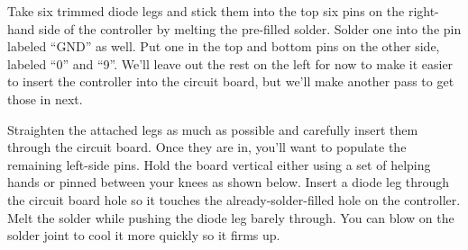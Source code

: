 \documentclass{article}
\begin{document}
\vspace{1em}

Take six trimmed diode legs and stick them into the top six pins on
the right-hand side of the controller by melting the pre-filled
solder. Solder one into the pin labeled ``GND'' as well. Put one in
the top and bottom pins on the other side, labeled ``0'' and
``9''. We'll leave out the rest on the left for now to make
it easier to insert the controller into the circuit board, but we'll
make another pass to get those in next.

\vspace{1em}
\noindent{}
\vspace{1em}

Straighten the attached legs as much as possible and carefully insert
them through the circuit board. Once they are in, you'll want to
populate the remaining left-side pins. Hold the board vertical either
using a set of helping hands or pinned between your knees as shown
below. Insert a diode leg through the circuit board hole so it touches
the already-solder-filled hole on the controller. Melt the solder
while pushing the diode leg barely through. You can blow on the solder
joint to cool it more quickly so it firms up.

\vspace{1em}
\noindent{}
\vspace{1em}
\end{document}
